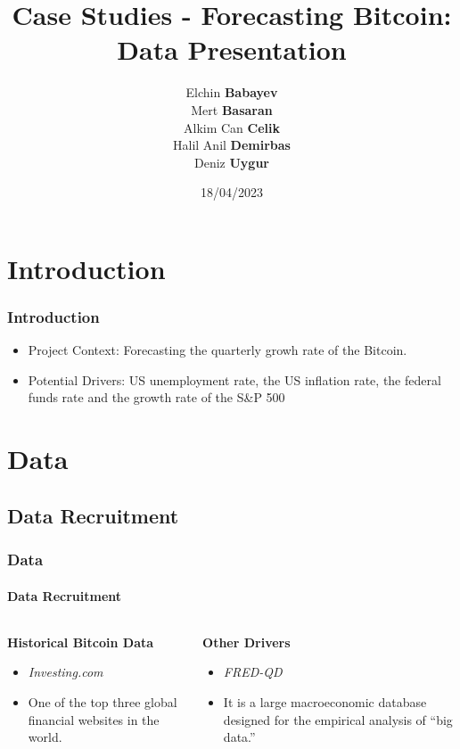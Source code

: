 \documentclass{beamer}
\title{Case Studies - Forecasting Bitcoin: \\Data Presentation}
\author{Elchin \textbf {Babayev}\\
Mert \textbf{Basaran}\\
Alkim Can \textbf{Celik}\\
Halil Anil \textbf{Demirbas}\\
Deniz \textbf{Uygur}}
\institute{Technische Universität Dortmund}
\date{18/04/2023}
\begin{document}
	\begin{frame}
		\titlepage %
	\end{frame}
	\section{Introduction}
	\begin{frame}
		\frametitle{Introduction}
		\begin{itemize}
			\item Project Context: Forecasting the quarterly growh rate of the Bitcoin.
			\item Potential Drivers: US unemployment rate, the US inflation rate, the federal funds rate and the growth rate of the S\&P 500
		\end{itemize}
	\end{frame}
	\section{Data}
	\subsection{Data Recruitment}
		\begin{frame}
		\frametitle{Data}
		\framesubtitle{Data Recruitment}
			\begin{columns}
				\begin{column}{0.5\textwidth}
					\textbf{Historical Bitcoin Data}
					\begin{itemize}
						\item \emph {Investing.com}
						\item One of the top three global financial websites in the world.
					\end{itemize}
				\end{column}
				\begin{column}{0.5\textwidth}
					\textbf{Other Drivers}
				\begin{itemize}
					\item \emph{FRED-QD}
					\item It is a large macroeconomic database designed for the empirical analysis of “big data.”
				\end{itemize}
				\end{column}
		\end{columns}
	\end{frame}
\end{document}

